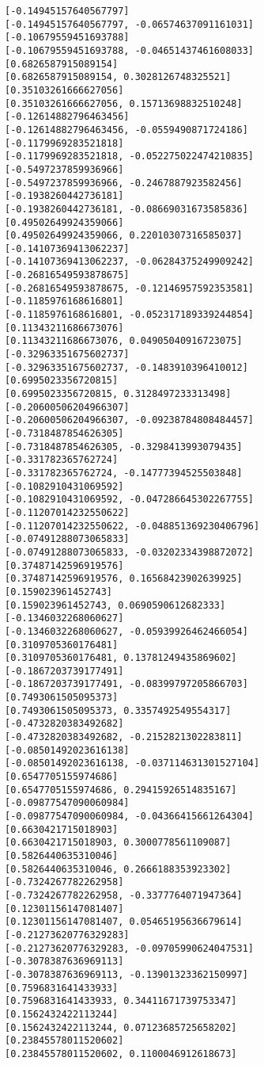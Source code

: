 \documentclass[11pt]{article}
\begin{document}
\begin{Verbatim}[commandchars=\\\{\}]
[-0.14945157640567797]
[-0.14945157640567797, -0.06574637091161031]
[-0.10679559451693788]
[-0.10679559451693788, -0.04651437461608033]
[0.6826587915089154]
[0.6826587915089154, 0.3028126748325521]
[0.35103261666627056]
[0.35103261666627056, 0.15713698832510248]
[-0.12614882796463456]
[-0.12614882796463456, -0.0559490871724186]
[-0.1179969283521818]
[-0.1179969283521818, -0.052275022474210835]
[-0.5497237859936966]
[-0.5497237859936966, -0.2467887923582456]
[-0.1938260442736181]
[-0.1938260442736181, -0.08669031673585836]
[0.49502649924359066]
[0.49502649924359066, 0.22010307316585037]
[-0.14107369413062237]
[-0.14107369413062237, -0.06284375249909242]
[-0.26816549593878675]
[-0.26816549593878675, -0.12146957592353581]
[-0.1185976168616801]
[-0.1185976168616801, -0.052317189339244854]
[0.11343211686673076]
[0.11343211686673076, 0.04905040916723075]
[-0.32963351675602737]
[-0.32963351675602737, -0.1483910396410012]
[0.6995023356720815]
[0.6995023356720815, 0.3128497233313498]
[-0.20600506204966307]
[-0.20600506204966307, -0.09238784808484457]
[-0.7318487854626305]
[-0.7318487854626305, -0.3298413993079435]
[-0.331782365762724]
[-0.331782365762724, -0.14777394525503848]
[-0.1082910431069592]
[-0.1082910431069592, -0.047286645302267755]
[-0.11207014232550622]
[-0.11207014232550622, -0.048851369230406796]
[-0.07491288073065833]
[-0.07491288073065833, -0.03202334398872072]
[0.37487142596919576]
[0.37487142596919576, 0.16568423902639925]
[0.159023961452743]
[0.159023961452743, 0.0690590612682333]
[-0.1346032268060627]
[-0.1346032268060627, -0.05939926462466054]
[0.3109705360176481]
[0.3109705360176481, 0.13781249435869602]
[-0.1867203739177491]
[-0.1867203739177491, -0.08399797205866703]
[0.7493061505095373]
[0.7493061505095373, 0.3357492549554317]
[-0.4732820383492682]
[-0.4732820383492682, -0.2152821302283811]
[-0.08501492023616138]
[-0.08501492023616138, -0.037114631301527104]
[0.6547705155974686]
[0.6547705155974686, 0.29415926514835167]
[-0.09877547090060984]
[-0.09877547090060984, -0.04366415661264304]
[0.6630421715018903]
[0.6630421715018903, 0.3000778561109087]
[0.5826440635310046]
[0.5826440635310046, 0.2666188353923302]
[-0.7324267782262958]
[-0.7324267782262958, -0.3377764071947364]
[0.12301156147081407]
[0.12301156147081407, 0.05465195636679614]
[-0.21273620776329283]
[-0.21273620776329283, -0.09705990624047531]
[-0.3078387636969113]
[-0.3078387636969113, -0.13901323362150997]
[0.7596831641433933]
[0.7596831641433933, 0.34411671739753347]
[0.1562432422113244]
[0.1562432422113244, 0.07123685725658202]
[0.23845578011520602]
[0.23845578011520602, 0.1100046912618673]

\end{Verbatim}
\end{document}
